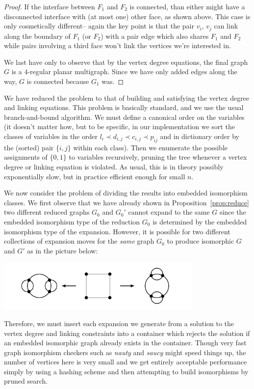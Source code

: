 \documentclass[amsmath,secnumarabic,floatfix,amssymb,nofootinbib,nobibnotes,letterpaper,11pt,tightenlines,showkeys]{revtex4}
\theoremstyle{definition}
\newcommand{\nauty}{\textit{nauty} }
\newcommand{\saucy}{\textit{saucy} }
\begin{document}
\begin{proof}
If the interface between $F_1$ and $F_2$ is connected, than either might have a disconnected interface with (at most one) other face, as shown above. This case is only cosmetically different-- again the key point is that the pair $v_i$, $v_j$ can link along the boundary of $F_1$ (or $F_2$) with a pair edge which also shares $F_1$ and $F_2$ while pairs involving a third face won't link the vertices we're interested in.

We last have only to observe that by the vertex degree equations, the final graph $G$ is a $4$-regular planar multigraph. Since we have only added edges along the way, $G$ is connected because $G_1$ was.
\end{proof}

We have reduced the problem to that of building and satisfying the vertex degree and linking equations. This problem is basically standard, and we use the usual branch-and-bound algorithm. We must define a canonical order on the variables (it doesn't matter how, but to be specific, in our implementation we sort the classes of variables in the order $l_i \prec d_{i,j} \prec c_{i,j} \prec p_{ij}$ and in dictionary order by the (sorted) pair $\{i,j\}$ within each class). Then we enumerate the possible assignments of $\{0,1\}$ to variables recursively, pruning the tree whenever a vertex degree or linking equation is violated. As usual, this is in theory possibly exponentially slow, but in practice efficient enough for small $n$.

We now consider the problem of dividing the results into embedded isomorphism classes. We first observe that we have already shown in Proposition~\ref{prop:reduce} two different reduced graphs $G_0$ and $G_0'$ cannot expand to the same $G$ since the embedded isomorphism type of the reduction $G_0$ is determined by the embedded isomorphism type of the expansion. However, it is possible for two different collections of expansion moves for the \emph{same} graph $G_0$ to produce isomorphic $G$ and $G'$ as in the picture below:
\begin{center}
\includegraphics[width=4in]{isomorphic-expansions}
\end{center}
Therefore, we must insert each expansion we generate from a solution to the vertex degree and linking constraints into a container which rejects the solution if an embedded isomorphic graph already exists in the container. Though very fast graph isomorphism checkers such as \nauty and \saucy might speed things up, the number of vertices here is very small and we get entirely acceptable performance simply by using a hashing scheme and then attempting to build isomorphisms by pruned search.
\end{document}
